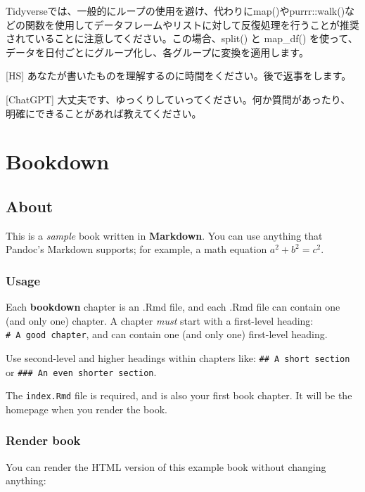 \documentclass[
]{book}
\theoremstyle{definition}
\theoremstyle{definition}
\theoremstyle{definition}
\theoremstyle{definition}
\theoremstyle{remark}
\begin{document}
Tidyverseでは、一般的にループの使用を避け、代わりにmap()やpurrr::walk()などの関数を使用してデータフレームやリストに対して反復処理を行うことが推奨されていることに注意してください。この場合、split() と map\_df() を使って、データを日付ごとにグループ化し、各グループに変換を適用します。

{[}HS{]} あなたが書いたものを理解するのに時間をください。後で返事をします。

{[}ChatGPT{]} 大丈夫です、ゆっくりしていってください。何か質問があったり、明確にできることがあれば教えてください。

\hypertarget{bookdown}{%
\chapter{Bookdown}\label{bookdown}}

\hypertarget{about}{%
\section{About}\label{about}}

This is a \emph{sample} book written in \textbf{Markdown}. You can use anything that Pandoc's Markdown supports; for example, a math equation \(a^2 + b^2 = c^2\).

\hypertarget{usage}{%
\subsection{Usage}\label{usage}}

Each \textbf{bookdown} chapter is an .Rmd file, and each .Rmd file can contain one (and only one) chapter. A chapter \emph{must} start with a first-level heading: \texttt{\#\ A\ good\ chapter}, and can contain one (and only one) first-level heading.

Use second-level and higher headings within chapters like: \texttt{\#\#\ A\ short\ section} or \texttt{\#\#\#\ An\ even\ shorter\ section}.

The \texttt{index.Rmd} file is required, and is also your first book chapter. It will be the homepage when you render the book.

\hypertarget{render-book}{%
\subsection{Render book}\label{render-book}}

You can render the HTML version of this example book without changing anything:
\end{document}
